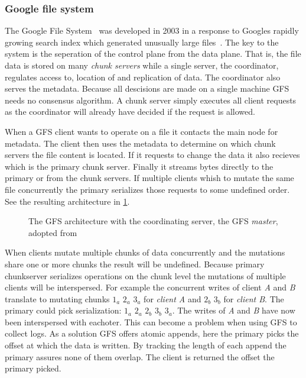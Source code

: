 \subsubsection*{Google file system}
The Google File System~\cite{GFS} was developed in 2003 in a response to Googles rapidly growing search index which generated unusually large files~\cite{GFS_interview}. The key to the system is the seperation of the control plane from the data plane. That is, the file data is stored on many \textit{chunk servers} while a single server, the coordinator, regulates access to, location of and replication of data. The coordinator also serves the metadata. Because all descisions are made on a single machine \textsc{GFS} needs no consensus algorithm. A chunk server simply executes all client requests as the coordinator will already have decided if the request is allowed. 

When a \textsc{GFS} client wants to operate on a file it contacts the main node for metadata. The client then uses the metadata to determine on which chunk servers the file content is located. If it requests to change the data it also recieves which is the primary chunk server. Finally it streams bytes directly to the primary or from the chunk servers. If multiple clients whish to mutate the same file concurrently the primary serializes those requests to some undefined order. See the resulting architecture in \cref{fig:GFS_arch}.
%
\begin{figure}[htbp]
	\centering
	
	\caption{The \textsc{GFS} architecture with the coordinating server, the \textsc{GFS} \textit{master}, adopted from~\cite{GFS}}
	\label{fig:GFS_arch}
\end{figure}
%
When clients mutate multiple chunks of data concurrently and the mutations share one or more chunks the result will be undefined. Because primary chunkserver serializes operations on the chunk level the mutations of multiple clients will be interspersed. For example the concurrent writes of client \textit{A} and \textit{B} translate to mutating chunks $1_a$ $2_a$ $3_a$ for \textit{client A} and $2_b$ $3_b$ for \textit{client B}. The primary could pick serialization: $1_a$ $2_a$ $2_b$ $3_b$ $3_a$. The writes of \textit{A} and \textit{B} have now been interspersed with eachoter. This can become a problem when using \textsc{GFS} to collect logs. As a solution \textsc{GFS} offers atomic appends, here the primary picks the offset at which the data is written. By tracking the length of each append the primary assures none of them overlap. The client is returned the offset the primary picked.

